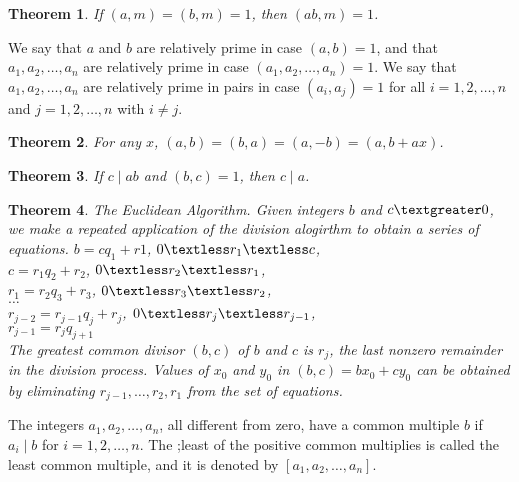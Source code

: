 \documentclass[11pt]{article} %
\newtheorem{theorem}{Theorem}[section]
\newenvironment{definition}[1][Definition]{\begin{trivlist}
\item[\hskip \labelsep {\bfseries #1}]}{\end{trivlist}}
\begin{document}
\begin{theorem}
	If $(a, m) = (b, m) = 1$, then $(ab, m) = 1$. 
\end{theorem}

\begin{definition}
	We say that $a$ and $b$ are relatively prime in case $(a, b) = 1$, and that $a_1, a_2, \ldots, a_n$ are relatively prime in case $(a_1, a_2, \ldots, a_n) = 1$. We say that $a_1, a_2, \ldots, a_n$ are relatively prime in pairs in case $(a_i, a_j) = 1$ for all $i = 1, 2, \ldots, n$ and $j = 1, 2, \ldots, n$ with $i \neq j $. 
\end{definition}

\begin{theorem}
	For any $x$, $(a, b) = (b, a) = (a, -b) = (a, b + ax)$. 
\end{theorem}

\begin{theorem}
	If $c \mid ab$ and $(b, c) = 1 $, then $c \mid a$. 
\end{theorem}

\begin{theorem}
	The Euclidean Algorithm. Given integers $b$ and $c \textgreater 0$, we make a repeated application of the division alogirthm to obtain a series of equations. 
	{\center
	$ b = cq_1 + r1$, $0 \textless r_1 \textless c$, 
	\\ $ c = r_1q_2 + r_2$, $0 \textless r_2 \textless r_1$,
	\\ $ r_1 = r_2q_3 + r_3$, $ 0 \textless r_3 \textless r_2$, 
	\\ $\ldots$
	\\ $r_{j-2} = r_{j - 1}q_j + r_j$, $0 \textless r_j \textless r_{j-1} $,
	\\ $ r_{j - 1} = {r_j}{q_{j+1}} $
}
	\\ The greatest common divisor $(b, c)$ of $b$ and $c$ is $r_j$, the last nonzero remainder in the division process. Values of $x_0$ and $y _0$ in $(b, c) = bx_0 + cy_0$ can be obtained by eliminating $r_{j-1}, \ldots, r_2, r_1 $ from the set of equations. 
\end{theorem}

\begin{definition}
	The integers $a_1, a_2, \ldots, a_n$, all different from zero, have a common multiple $b$ if $a_i \mid b$ for $i = 1, 2, \ldots, n$. The ;least of the positive common multiplies is called the least common multiple, and it is denoted by $[a_1, a_2, \ldots, a_n]$. 
\end{definition}
\end{document}
